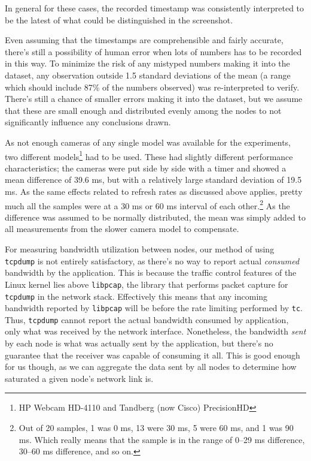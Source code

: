 In general for these cases, the recorded timestamp was consistently interpreted to be the latest of what could be distinguished in the screenshot.

Even assuming that the timestamps are comprehensible and fairly accurate, there's still a possibility of human error when lots of numbers has to be recorded in this way. To minimize the risk of any mistyped numbers making it into the dataset, any observation outside 1.5 standard deviations of the mean (a range which should include 87\% of the numbers observed) was re-interpreted to verify. There's still a chance of smaller errors making it into the dataset, but we assume that these are small enough and distributed evenly among the nodes to not significantly influence any conclusions drawn.

As not enough cameras of any single model was available for the experiments, two different models\footnote{HP Webcam HD-4110 and Tandberg (now Cisco) PrecisionHD} had to be used. These had slightly different performance characteristics; the cameras were put side by side with a timer and showed a mean difference of 39.6 ms, but with a relatively large standard deviation of 19.5 ms. As the same effects related to refresh rates as discussed above applies, pretty much all the samples were at a 30 ms or 60 ms interval of each other.\footnote{Out of 20 samples, 1 was 0 ms, 13 were 30 ms, 5 were 60 ms, and 1 was 90 ms. Which really means that the sample is in the range of 0--29 ms difference, 30--60 ms difference, and so on.} As the difference was assumed to be normally distributed, the mean was simply added to all measurements from the slower camera model to compensate.

For measuring bandwidth utilization between nodes, our method of using \texttt{tcpdump} is not entirely satisfactory, as there's no way to report actual \emph{consumed} bandwidth by the application. This is because the traffic control features of the Linux kernel lies above \texttt{libpcap}, the library that performs packet capture for \texttt{tcpdump} in the network stack. Effectively this means that any incoming bandwidth reported by \texttt{libpcap} will be before the rate limiting performed by \texttt{tc}. Thus, \texttt{tcpdump} cannot report the actual bandwidth consumed by application, only what was received by the network interface. Nonetheless, the bandwidth \emph{sent} by each node is what was actually sent by the application, but there's no guarantee that the receiver was capable of consuming it all. This is good enough for us though, as we can aggregate the data sent by all nodes to determine how saturated a given node's network link is.

